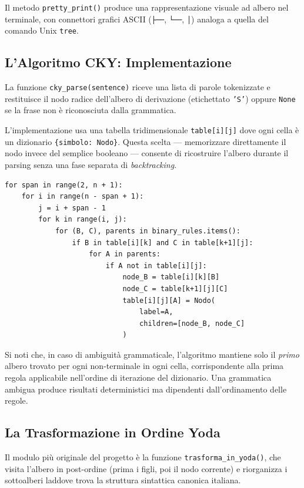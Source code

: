 \documentclass[12pt, a4paper]{article}
\begin{document}
Il metodo \texttt{pretty\_print()} produce una rappresentazione visuale ad albero
nel terminale, con connettori grafici ASCII (\texttt{├──}, \texttt{└──}, \texttt{│})
analoga a quella del comando Unix \texttt{tree}.

\subsection{L'Algoritmo CKY: Implementazione}

La funzione \texttt{cky\_parse(sentence)} riceve una lista di parole tokenizzate
e restituisce il nodo radice dell'albero di derivazione (etichettato \texttt{'S'})
oppure \texttt{None} se la frase non è riconosciuta dalla grammatica.

L'implementazione usa una tabella tridimensionale \texttt{table[i][j]} dove ogni
cella è un dizionario \texttt{\{simbolo: Nodo\}}. Questa scelta — memorizzare
direttamente il nodo invece del semplice booleano — consente di ricostruire
l'albero durante il parsing senza una fase separata di \textit{backtracking}.

\begin{lstlisting}[caption={Nucleo dell'algoritmo CKY con ricostruzione dell'albero}]
for span in range(2, n + 1):
    for i in range(n - span + 1):
        j = i + span - 1
        for k in range(i, j):
            for (B, C), parents in binary_rules.items():
                if B in table[i][k] and C in table[k+1][j]:
                    for A in parents:
                        if A not in table[i][j]:
                            node_B = table[i][k][B]
                            node_C = table[k+1][j][C]
                            table[i][j][A] = Nodo(
                                label=A,
                                children=[node_B, node_C]
                            )
\end{lstlisting}

Si noti che, in caso di ambiguità grammaticale, l'algoritmo mantiene solo il
\textit{primo} albero trovato per ogni non-terminale in ogni cella, corrispondente
alla prima regola applicabile nell'ordine di iterazione del dizionario. Una
grammatica ambigua produce risultati deterministici ma dipendenti dall'ordinamento
delle regole.

\subsection{La Trasformazione in Ordine Yoda}

Il modulo più originale del progetto è la funzione \texttt{trasforma\_in\_yoda()},
che visita l'albero in post-ordine (prima i figli, poi il nodo corrente) e
riorganizza i sottoalberi laddove trova la struttura sintattica canonica italiana.
\end{document}
